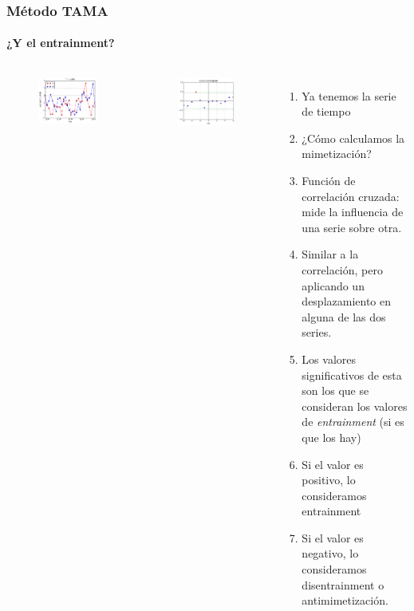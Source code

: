 \begin{frame}
  \frametitle{Método TAMA}
  \framesubtitle{¿Y el entrainment?}
  \begin{columns}
  \begin{figure}[t]
    \includegraphics[scale=0.28]{images/time_plot.png}
  \end{figure}
  \begin{figure}[t]
    \includegraphics[scale=0.28]{images/cross_correlogram.png}
  \end{figure}
  \begin{enumerate}
    \item Ya tenemos la serie de tiempo
    \item ¿Cómo calculamos la mimetización?
    \item Función de correlación cruzada: mide la influencia de una serie sobre otra.
    \item Similar a la correlación, pero aplicando un desplazamiento en alguna de las dos series.
    \item Los valores significativos de esta son los que se consideran los valores de \emph{entrainment} (si es que los hay)
    \item Si el valor es positivo, lo consideramos entrainment
    \item Si el valor es negativo, lo consideramos disentrainment o antimimetización.
  \end{enumerate}

  \end{columns}
\end{frame}
